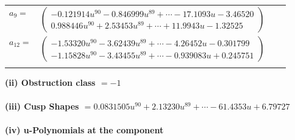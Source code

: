 \documentclass[1p]{elsarticle_modified}
\theoremstyle{definition}
\begin{document}
\begin{tabular}{m{7pt} m{180pt} m{7pt} m{180pt} }
\flushright $a_{9}=$&$\begin{pmatrix}-0.121914 u^{90}-0.846999 u^{89}+\cdots-17.1093 u-3.46520\\0.988446 u^{90}+2.53453 u^{89}+\cdots+11.9943 u-1.32525\end{pmatrix}$ \\
\flushright $a_{12}=$&$\begin{pmatrix}-1.53320 u^{90}-3.62439 u^{89}+\cdots-4.26452 u-0.301799\\-1.15828 u^{90}-3.43455 u^{89}+\cdots-0.939083 u+0.245751\end{pmatrix}$\\&\end{tabular}
\flushleft \textbf{(ii) Obstruction class $= -1$}\\~\\
\flushleft \textbf{(iii) Cusp Shapes $= 0.0831505 u^{90}+2.13230 u^{89}+\cdots-61.4353 u+6.79727$}\\~\\
\newpage\renewcommand{\arraystretch}{1}
\flushleft \textbf{(iv) u-Polynomials at the component}\newline \\
\end{document}
